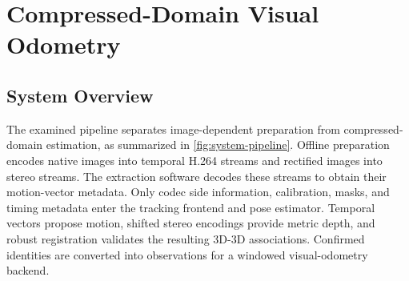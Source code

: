 
\chapter{Compressed-Domain Visual Odometry}\label{chapter:method}

\section{System Overview}

The examined pipeline separates image-dependent preparation from compressed-domain
estimation, as summarized in \autoref{fig:system-pipeline}. Offline preparation
encodes native images into temporal H.264 streams and rectified images into
stereo streams. The extraction software decodes these streams to obtain their
motion-vector metadata. Only codec side information, calibration, masks, and
timing metadata enter the tracking frontend and pose estimator.
Temporal vectors propose motion, shifted stereo encodings provide metric
depth, and robust registration validates the resulting 3D-3D associations.
Confirmed identities are converted into observations for a windowed
visual-odometry backend.

